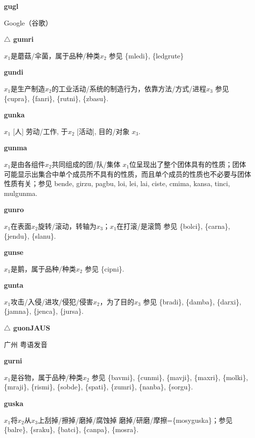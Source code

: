 \documentclass[notitlepage,twocolumn,a4paper,10pt]{book}
\begin{document}
{{\sffamily\bfseries gugl} Google（谷歌）

{\sffamily\bfseries $\triangle$ gumri} $x_1$是蘑菇\slash{}伞菌，属于品种\slash{}种类$x_2$ \textemdash{} 参见 \{mledi\}, \{ledgrute\}

{\sffamily\bfseries gundi}\enspace {\ttfamily\bfseries[gud]}  $x_1$是生产制造$x_2$的工业活动\slash{}系统的制造行为，依靠方法\slash{}方式\slash{}进程$x_3$ \textemdash{} 参见 \{cupra\}, \{fanri\}, \{rutni\}, \{zbasu\}.

{\sffamily\bfseries gunka}\enspace {\ttfamily\bfseries[gun     gu'a]}  $x_1$ [人] 劳动\slash{}工作, 于$x_2$ [活动], 目的\slash{}对象 $x_3$.

{\sffamily\bfseries gunma}\enspace {\ttfamily\bfseries[gum]}  $x_1$是由各组件$x_2$共同组成的团\slash{}队\slash{}集体 \textemdash{} $x_1$位呈现出了整个团体具有的性质；团体可能显示出集合中单个成员所不具有的性质，而且单个成员的性质也不必要与团体性质有关；参见 {bende}, {girzu}, {pagbu}, {loi}, {lei}, {lai}, {ciste}, {cmima}, {kansa}, {tinci}, {mulgunma}.

{\sffamily\bfseries gunro}\enspace {\ttfamily\bfseries[gur     gu'o]}  $x_1$在表面$x_2$旋转\slash{}滚动，转轴为$x_3$；$x_1$在打滚\slash{}是滚筒 \textemdash{} 参见 \{bolci\}, \{carna\}, \{jendu\}, \{slanu\}.

{\sffamily\bfseries gunse} $x_1$是鹅，属于品种\slash{}种类$x_2$ \textemdash{} 参见 \{cipni\}.

{\sffamily\bfseries gunta}\enspace {\ttfamily\bfseries[gut]}  $x_1$攻击\slash{}入侵\slash{}进攻\slash{}侵犯\slash{}侵害$x_2$，为了目的$x_3$ \textemdash{} 参见 \{bradi\}, \{damba\}, \{darxi\}, \{jamna\}, \{jenca\}, \{jursa\}.

{\sffamily\bfseries $\triangle$ guonJAUS} 广州 \textemdash{} 粤语发音

{\sffamily\bfseries gurni}\enspace {\ttfamily\bfseries[    gru]}  $x_1$是谷物，属于品种\slash{}种类$x_2$ \textemdash{} 参见 \{bavmi\}, \{cunmi\}, \{mavji\}, \{maxri\}, \{molki\}, \{mraji\}, \{rismi\}, \{sobde\}, \{spati\}, \{zumri\}, \{nanba\}, \{sorgu\}.

{\sffamily\bfseries guska}\enspace {\ttfamily\bfseries[guk]}  $x_1$将$x_2$从$x_3$上刮掉\slash{}擦掉\slash{}磨掉\slash{}腐蚀掉 \textemdash{} 磨掉\slash{}研磨\slash{}摩擦=\{mosyguska\}；参见 \{balre\}, \{sraku\}, \{batci\}, \{canpa\}, \{mosra\}.

}
\end{document}
